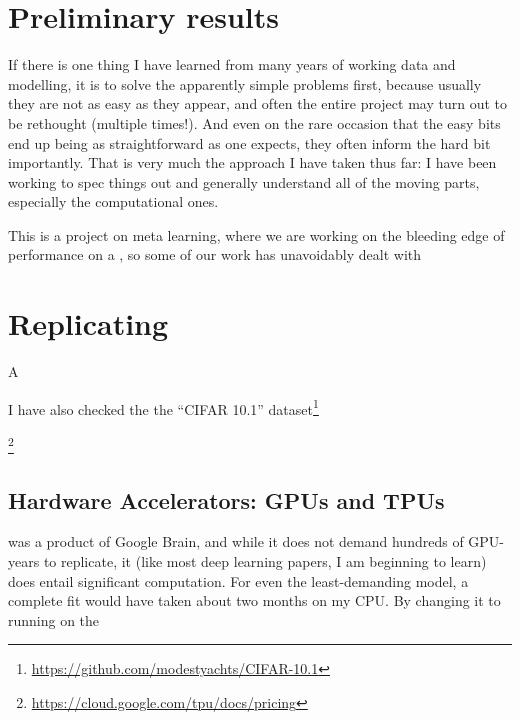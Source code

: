 \documentclass[10pt,twocolumn,letterpaper]{article}
\begin{document}
\section{Preliminary results}

If there is one thing I have learned from many years of working data and modelling, it is to solve the apparently simple problems first, because usually they are not as easy as they appear, and often the entire project may turn out to be rethought (multiple times!). %
And even on the rare occasion that the easy bits end up being as straightforward as one expects, they often inform the hard bit importantly.
That is very much the approach I have taken thus far: I have been working to spec things out and generally understand all of the moving parts, especially the computational ones. 

This is a project on meta learning, where we are working on the bleeding edge of performance on a , so  some of our work has unavoidably dealt with 


\section{Replicating \cite{Cubuk2018}}
A 

I have also checked the the ``CIFAR 10.1'' dataset\footnote{\url{https://github.com/modestyachts/CIFAR-10.1}}


\footnote{\url{https://cloud.google.com/tpu/docs/pricing}}

\subsection{Hardware Accelerators: GPUs and TPUs}
\cite{Cubuk2018} was a product of Google Brain, and while it does not demand hundreds of GPU-years to replicate, it (like most deep learning papers, I am beginning to learn) does entail significant computation. For even the least-demanding model, a complete fit would have taken about two months on my CPU. By changing it to running on the 
\end{document}
